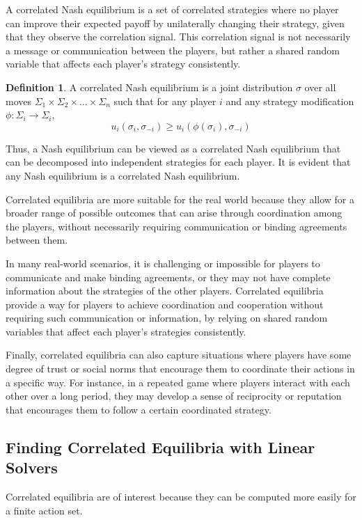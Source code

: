 \documentclass[preprint,12pt,authoryear]{elsarticle}
\theoremstyle{definition}
\newtheorem{definition}{Definition}[section]
\begin{document}
A correlated Nash equilibrium is a set of correlated strategies where no player can improve their expected payoff by unilaterally changing their strategy, given that they observe the correlation signal. This correlation signal is not necessarily a message or communication between the players, but rather a shared random variable that affects each player's strategy consistently.

\begin{definition}
\label{def:cor}
A correlated Nash equilibrium is a joint distribution $\sigma$ over all moves $\Sigma_1 \times \Sigma_2 \times \ldots \times \Sigma_n$ such that for any player $i$ and any strategy modification $\phi: \Sigma_i \rightarrow \Sigma_i$, $$u_i(\sigma_i, \sigma_{-i}) \ge u_i(\phi(\sigma_i), \sigma_{-i})$$
\end{definition}

Thus, a Nash equilibrium can be viewed as a correlated Nash equilibrium that can be decomposed into independent strategies for each player. It is evident that any Nash equilibrium is a correlated Nash equilibrium.

Correlated equilibria are more suitable for the real world because they allow for a broader range of possible outcomes that can arise through coordination among the players, without necessarily requiring communication or binding agreements between them.

In many real-world scenarios, it is challenging or impossible for players to communicate and make binding agreements, or they may not have complete information about the strategies of the other players. Correlated equilibria provide a way for players to achieve coordination and cooperation without requiring such communication or information, by relying on shared random variables that affect each player's strategies consistently.

Finally, correlated equilibria can also capture situations where players have some degree of trust or social norms that encourage them to coordinate their actions in a specific way. For instance, in a repeated game where players interact with each other over a long period, they may develop a sense of reciprocity or reputation that encourages them to follow a certain coordinated strategy.

\subsection{Finding Correlated Equilibria with Linear Solvers}
\label{sec:linear}
Correlated equilibria are of interest because they can be computed more easily for a finite action set.
\end{document}

